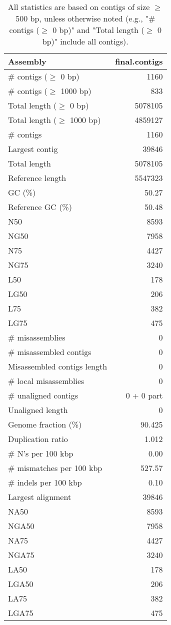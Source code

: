 \documentclass[12pt,a4paper]{article}
\begin{document}
\begin{table}[ht]
\begin{center}
\caption{All statistics are based on contigs of size $\geq$ 500 bp, unless otherwise noted (e.g., "\# contigs ($\geq$ 0 bp)" and "Total length ($\geq$ 0 bp)" include all contigs).}
\begin{tabular}{|l*{1}{|r}|}
\hline
Assembly & final.contigs \\ \hline
\# contigs ($\geq$ 0 bp) & 1160 \\ \hline
\# contigs ($\geq$ 1000 bp) & 833 \\ \hline
Total length ($\geq$ 0 bp) & 5078105 \\ \hline
Total length ($\geq$ 1000 bp) & 4859127 \\ \hline
\# contigs & 1160 \\ \hline
Largest contig & 39846 \\ \hline
Total length & 5078105 \\ \hline
Reference length & 5547323 \\ \hline
GC (\%) & 50.27 \\ \hline
Reference GC (\%) & 50.48 \\ \hline
N50 & 8593 \\ \hline
NG50 & 7958 \\ \hline
N75 & 4427 \\ \hline
NG75 & 3240 \\ \hline
L50 & 178 \\ \hline
LG50 & 206 \\ \hline
L75 & 382 \\ \hline
LG75 & 475 \\ \hline
\# misassemblies & 0 \\ \hline
\# misassembled contigs & 0 \\ \hline
Misassembled contigs length & 0 \\ \hline
\# local misassemblies & 0 \\ \hline
\# unaligned contigs & 0 + 0 part \\ \hline
Unaligned length & 0 \\ \hline
Genome fraction (\%) & 90.425 \\ \hline
Duplication ratio & 1.012 \\ \hline
\# N's per 100 kbp & 0.00 \\ \hline
\# mismatches per 100 kbp & 527.57 \\ \hline
\# indels per 100 kbp & 0.10 \\ \hline
Largest alignment & 39846 \\ \hline
NA50 & 8593 \\ \hline
NGA50 & 7958 \\ \hline
NA75 & 4427 \\ \hline
NGA75 & 3240 \\ \hline
LA50 & 178 \\ \hline
LGA50 & 206 \\ \hline
LA75 & 382 \\ \hline
LGA75 & 475 \\ \hline
\end{tabular}
\end{center}
\end{table}
\end{document}
